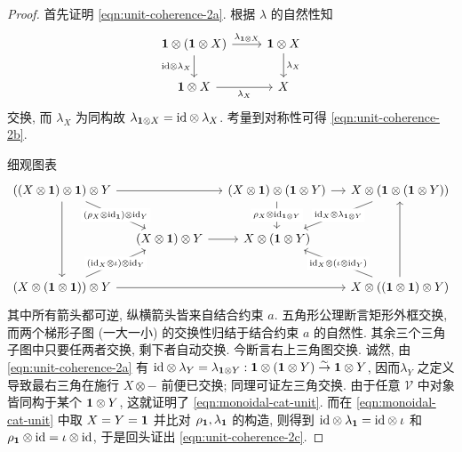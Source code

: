 \begin{proof}
	首先证明 \eqref{eqn:unit-coherence-2a}. 根据 $\lambda$ 的自然性知
	\[ \begin{tikzcd}
		\munit \otimes (\munit \otimes X) \arrow[r, "{\lambda_{\munit \otimes X}}"] \arrow[d, "{\identity \otimes \lambda_X}"'] & \munit \otimes X \arrow[d, "{\lambda_X}"] \\
		\munit \otimes X \arrow[r, "{\lambda_X}"'] & X
	\end{tikzcd} \]
	交换, 而 $\lambda_X$ 为同构故 $\lambda_{\mathbf{1} \otimes X} = \mathrm{id} \otimes \lambda_X$. 考量到对称性可得 \eqref{eqn:unit-coherence-2b}.

	细观图表
	\begin{equation}\label{eqn:coherence-aux0} \begin{tikzcd}[column sep=small, row sep=2.25em]
		((X \otimes \munit) \otimes \munit) \otimes Y \arrow[dd] \arrow[rr] \arrow[rd, "{(\rho_X \otimes \identity_\munit) \otimes \identity_Y}" description] & & (X \otimes \munit) \otimes (\munit \otimes Y) \arrow[r] \arrow[d, "{\rho_X \otimes \identity_{\munit \otimes Y}}" description] & X \otimes (\munit \otimes (\munit \otimes Y)) \arrow[ld, "{\identity_X \otimes \lambda_{\munit \otimes Y}}" description] \\
		& (X \otimes \munit) \otimes Y \arrow[r] & X \otimes (\munit \otimes Y) & \\
		(X \otimes (\munit \otimes \munit)) \otimes Y \arrow[rrr] \arrow[ru, "{(\identity_X \otimes \iota) \otimes \identity_Y}" description] & & & X \otimes ((\munit \otimes \munit) \otimes Y) \arrow[uu] \arrow[lu, "{\identity_X \otimes (\iota \otimes \identity_Y)}" description]
  \end{tikzcd} \end{equation}
	其中所有箭头都可逆, 纵横箭头皆来自结合约束 $a$. 五角形公理断言矩形外框交换, 而两个梯形子图 (一大一小) 的交换性归结于结合约束 $a$ 的自然性. 其余三个三角子图中只要任两者交换, 剩下者自动交换. 今断言右上三角图交换. 诚然, 由 \eqref{eqn:unit-coherence-2a} 有 $\mathrm{id} \otimes \lambda_Y = \lambda_{\mathbf{1} \otimes Y}: \mathbf{1} \otimes (\mathbf{1} \otimes Y) \stackrel{\sim}{\rightarrow} \mathbf{1} \otimes Y$, 因而$\lambda_Y$ 之定义导致最右三角在施行 $X \otimes -$ 前便已交换; 同理可证左三角交换. 由于任意 $\mathcal{V}$ 中对象皆同构于某个 $\mathbf{1} \otimes Y$, 这就证明了 \eqref{eqn:monoidal-cat-unit}. 而在 \eqref{eqn:monoidal-cat-unit} 中取 $X=Y=\mathbf{1}$ 并比对 $\rho_{\mathbf{1}}, \lambda_{\mathbf{1}}$ 的构造, 则得到 $\mathrm{id} \otimes \lambda_{\mathbf{1}} = \mathrm{id} \otimes \iota$ 和 $\rho_{\mathbf{1}} \otimes \mathrm{id} = \iota \otimes \mathrm{id}$, 于是回头证出 \eqref{eqn:unit-coherence-2c}.


\end{proof}
